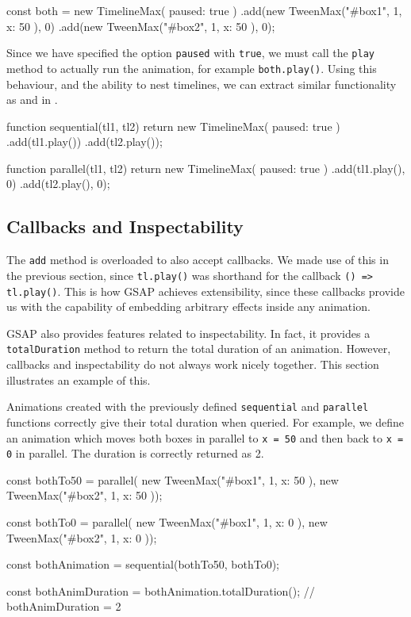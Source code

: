\begin{js}
const both = new TimelineMax({ paused: true })
  .add(new TweenMax("#box1", 1, { x: 50 }), 0)
  .add(new TweenMax("#box2", 1, { x: 50 }), 0);
\end{js}

Since we have specified the option \texttt{paused} with \texttt{true}, we must call the \texttt{play} method to actually run the animation, for example \texttt{both.play()}. Using this behaviour, and the ability to nest timelines, we can extract similar functionality as  and  in \dsl{}.

\begin{js}
function sequential(tl1, tl2) {
  return new TimelineMax({ paused: true })
    .add(tl1.play())
    .add(tl2.play()); }

function parallel(tl1, tl2) {
  return new TimelineMax({ paused: true })
    .add(tl1.play(), 0)
    .add(tl2.play(), 0); }
\end{js}

\subsection{Callbacks and Inspectability}

The \texttt{add} method is overloaded to also accept callbacks. We made use of this in the previous section, since \texttt{tl.play()} was shorthand for the callback \texttt{() => tl.play()}. This is how GSAP achieves extensibility, since these callbacks provide us with the capability of embedding arbitrary effects inside any animation.

GSAP also provides features related to inspectability. In fact, it provides a \texttt{totalDuration} method to return the total duration of an animation. However, callbacks and inspectability do not always work nicely together. This section illustrates an example of this.

Animations created with the previously defined \texttt{sequential} and \texttt{parallel} functions correctly give their total duration when queried. For example, we define an animation which moves both boxes in parallel to \texttt{x = 50} and then back to \texttt{x = 0} in parallel. The duration is correctly returned as 2.

\begin{js}
const bothTo50 = parallel(
  new TweenMax("#box1", 1, { x: 50 }),
  new TweenMax("#box2", 1, { x: 50 }));

const bothTo0 = parallel(
  new TweenMax("#box1", 1, { x: 0 }),
  new TweenMax("#box2", 1, { x: 0 }));

const bothAnimation = sequential(bothTo50, bothTo0);

const bothAnimDuration = bothAnimation.totalDuration();
// bothAnimDuration = 2
\end{js}

